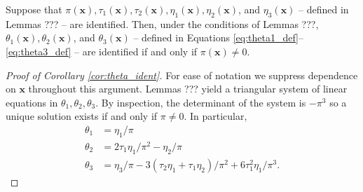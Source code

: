 \documentclass[12pt]{article}
\begin{document}
\begin{cor}
  \label{cor:theta_ident}
  Suppose that $\pi(\mathbf{x}), \tau_1(\mathbf{x}), \tau_2(\mathbf{x}),  \eta_1(\mathbf{x}), \eta_2(\mathbf{x})$, and $\eta_3(\mathbf{x})$ -- defined in Lemmas ??? -- are identified.
  Then, under the conditions of Lemmas ???, $\theta_1(\mathbf{x}), \theta_2(\mathbf{x})$, and $\theta_3(\mathbf{x})$ -- defined in Equations \ref{eq:theta1_def}--\ref{eq:theta3_def} -- are identified if and only if $\pi(\mathbf{x}) \neq 0$.
\end{cor}
\begin{proof}[Proof of Corollary \ref{cor:theta_ident}]
  For ease of notation we suppress dependence on $\mathbf{x}$ throughout this argument.
  Lemmas ??? yield a triangular system of linear equations in $\theta_1, \theta_2, \theta_3$.
By inspection, the determinant of the system is $-\pi^3$ so a unique solution exists if and only if $\pi \neq 0$. 
In particular,
\begin{align*}
  \theta_1 &= \eta_1 / \pi\\
  \theta_2 &= 2\tau_1\eta_1/\pi^2 - \eta_2/\pi\\
  \theta_3 &= \eta_3/\pi - 3(\tau_2\eta_1 + \tau_1\eta_2)/\pi^2 + 6\tau_1^2\eta_1/\pi^3.
\end{align*}
\end{proof}
\end{document}

